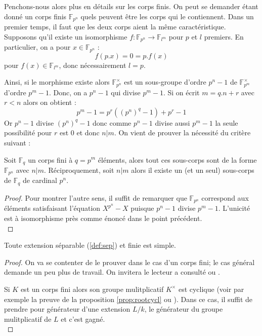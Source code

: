 \documentclass[a4paper]{article} %
\numberwithin{section}{part}
\numberwithin{equation}{section}
\newcommand\GF[1]{\mathbb{F}_{#1}}
\begin{document}
Penchons-nous alors plus en détails sur les corps finis. On peut se demander
étant donné un corps finis $\GF{p^n}$ quels peuvent être les corps qui le
contiennent. Dans un premier temps, il faut que les deux corps aient la même
caractéristique. Supposons qu'il existe un isomorphisme $f : \GF{p^n} \to 
\GF{l^m}$ pour $p$ et $l$ premiers. En particulier, on a pour $x\in\GF{p^n}$ :
\[f(p.x) = 0 = p.f(x)\]
pour $f(x)\in\GF{l^m}$, donc nécessairement $l = p$.\par
Ainsi, si le morphisme existe alors $\GF{p^n}^{\times}$ est un sous-groupe
d'ordre $p^n - 1$ de $\GF{p^m}^{\times}$ d'ordre $p^m - 1$. Donc, on a $p^n - 1$
qui divise $p^m - 1$. Si on écrit $m = q.n + r$ avec $r < n$ alors on obtient :
\[p^m - 1 = p^r((p^n)^q - 1) + p^r - 1\]
Or $p^n - 1$ divise $(p^n)^q - 1$ donc comme $p^n - 1$ divise aussi $p^m - 1$ la
seule possibilité pour $r$ est $0$ et donc $n|m$. On vient de prouver la
nécessité du critère suivant :

\begin{prop}
Soit $\GF{q}$ un corps fini à $q = p^m$ éléments, alors tout ces sous-corps sont
de la forme $\GF{p^n}$ avec $n|m$. Réciproquement, soit $n|m$ alors il existe un
(et un seul) sous-corps de $\GF{q}$ de cardinal $p^n$.
\end{prop}
\begin{proof}
Pour montrer l'autre sens, il suffit de remarquer que $\GF{p^n}$ correspond aux
éléments satisfaisant l'équation $X^{p^n} - X$ puisque $p^n - 1$ divise $p^m -
1$. L'unicité est à isomorphisme près comme énoncé dans le point précédent.\\
\end{proof}

\begin{thm}
\label{th:elemprim}
Toute extension séparable (\ref{def:sep}) et finie est simple.
\end{thm}
\begin{proof}
On va se contenter de le prouver dans le cas d'un corps fini; le cas général
demande un peu plus de travail. On invitera le lecteur a consulté
\cite[p.~87]{Esc} ou \cite[Chap. VIII]{Pol}.\par
Si $K$ est un corps fini alors son groupe mulitplicatif $K^{\times}$ est
cyclique (voir par exemple la preuve de la proposition \ref{prop:rootcycl} ou
\cite[p.~50]{LiNi1}). Dans ce cas, il suffit de prendre pour générateur d'une
extension $L/k$, le générateur du groupe mulitplicatif de $L$ et c'est gagné.\\
\end{proof}
\end{document}

